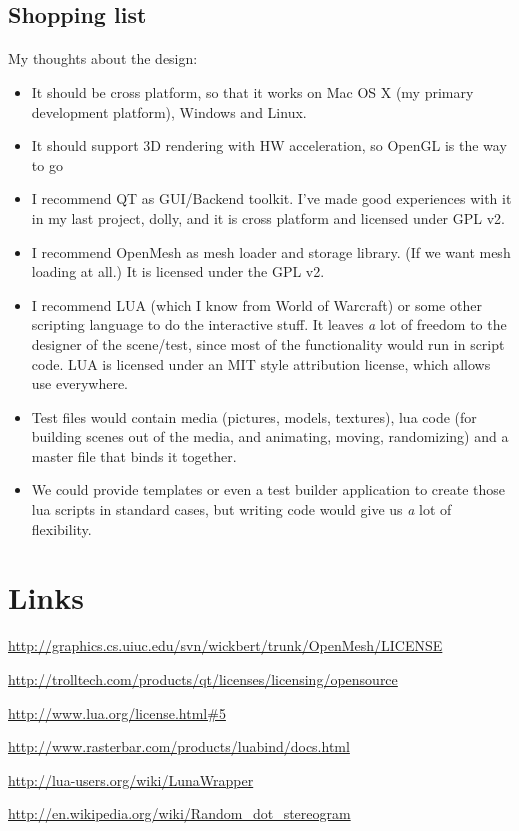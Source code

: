 \documentclass[11pt]{scrartcl}
\begin{document}
\begin{multicols}{2}
\section{Shopping list}
\paragraph{}

My thoughts about the design:
\begin{itemize}
\item It should be cross platform, so that it works on Mac OS X (my primary development platform), Windows and Linux.
\item It should support 3D rendering with HW acceleration, so OpenGL is the way to go
\item I recommend QT as GUI/Backend toolkit. I've made good experiences with it in my last project, dolly, and it is cross platform and licensed under GPL v2.
\item I recommend OpenMesh as mesh loader and storage library. (If we want mesh loading at all.) It is licensed under the GPL v2.
\item I recommend LUA (which I know from World of Warcraft) or some other scripting language to do the interactive stuff. It leaves {\textit a lot} of freedom to the designer of the scene/test, since most of the functionality would run in script code. LUA is licensed under an MIT style attribution license, which allows use everywhere.
\item Test files would contain media (pictures, models, textures), lua code (for building scenes out of the media, and animating, moving, randomizing) and a master file that binds it together.
\item We could provide templates or even a test builder application to create those lua scripts in standard cases, but writing code would give us {\textit a lot} of flexibility.
\end{itemize}

\end{multicols}

\appendix

\section{Links}
\url{http://graphics.cs.uiuc.edu/svn/wickbert/trunk/OpenMesh/LICENSE}

\url{http://trolltech.com/products/qt/licenses/licensing/opensource}

\url{http://www.lua.org/license.html#5}

\url{http://www.rasterbar.com/products/luabind/docs.html}

\url{http://lua-users.org/wiki/LunaWrapper}

\url{http://en.wikipedia.org/wiki/Random_dot_stereogram}
\end{document}
